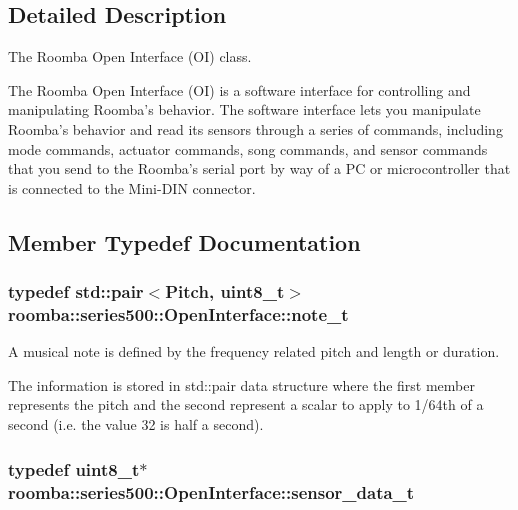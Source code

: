 \subsection{Detailed Description}
The Roomba Open Interface (O\+I) class. 

The Roomba Open Interface (O\+I) is a software interface for controlling and manipulating Roomba’s behavior. The software interface lets you manipulate Roomba’s behavior and read its sensors through a series of commands, including mode commands, actuator commands, song commands, and sensor commands that you send to the Roomba’s serial port by way of a P\+C or microcontroller that is connected to the Mini-\/\+D\+I\+N connector. 

\subsection{Member Typedef Documentation}
\hypertarget{classroomba_1_1series500_1_1_open_interface_a0c3ce39185b625b630aa156be63fd57c}{
\subsubsection[{note\+\_\+t}]{\setlength{\rightskip}{0pt plus 5cm}typedef std\+::pair$<$Pitch, uint8\+\_\+t$>$ {\bf roomba\+::series500\+::\+Open\+Interface\+::note\+\_\+t}}}\label{classroomba_1_1series500_1_1_open_interface_a0c3ce39185b625b630aa156be63fd57c}


A musical note is defined by the frequency related pitch and length or duration. 

The information is stored in std\+::pair data structure where the first member represents the pitch and the second represent a scalar to apply to 1/64th of a second (i.\+e. the value 32 is half a second). \hypertarget{classroomba_1_1series500_1_1_open_interface_a292dd23045ef4827673822518f08fb0f}{
\subsubsection[{sensor\+\_\+data\+\_\+t}]{\setlength{\rightskip}{0pt plus 5cm}typedef uint8\+\_\+t$\ast$ {\bf roomba\+::series500\+::\+Open\+Interface\+::sensor\+\_\+data\+\_\+t}}}\label{classroomba_1_1series500_1_1_open_interface_a292dd23045ef4827673822518f08fb0f}



